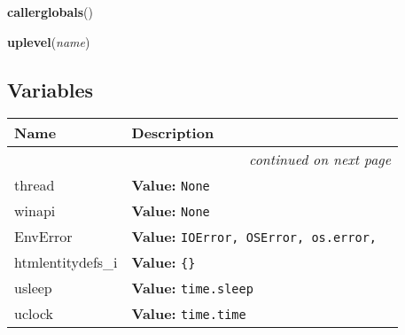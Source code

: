 \hspace{.8\funcindent}\begin{boxedminipage}{\funcwidth}

    \raggedright \textbf{callerglobals}()

\setlength{\parskip}{2ex}
\setlength{\parskip}{1ex}
    \end{boxedminipage}

    \label{nMOLDYN:GUI:HTMLReader:mfxutil:uplevel}

    \vspace{0.5ex}

\hspace{.8\funcindent}\begin{boxedminipage}{\funcwidth}

    \raggedright \textbf{uplevel}(\textit{name})

\setlength{\parskip}{2ex}
\setlength{\parskip}{1ex}
    \end{boxedminipage}



  \subsection{Variables}

    \vspace{-1cm}
\hspace{\varindent}\begin{longtable}{|p{\varnamewidth}|p{\vardescrwidth}|l}
\cline{1-2}
\cline{1-2} \centering \textbf{Name} & \centering \textbf{Description}& \\
\cline{1-2}
\endhead\cline{1-2}\multicolumn{3}{r}{\small\textit{continued on next page}}\\\endfoot\cline{1-2}
\endlastfoot\raggedright t\-h\-r\-e\-a\-d\- & \raggedright \textbf{Value:} 
{\tt None}&\\
\cline{1-2}
\raggedright w\-i\-n\-3\-2\-a\-p\-i\- & \raggedright \textbf{Value:} 
{\tt None}&\\
\cline{1-2}
\raggedright E\-n\-v\-E\-r\-r\-o\-r\- & \raggedright \textbf{Value:} 
{\tt IOError, OSError, os.error,}&\\
\cline{1-2}
\raggedright h\-t\-m\-l\-e\-n\-t\-i\-t\-y\-d\-e\-f\-s\-\_\-i\- & \raggedright \textbf{Value:} 
{\tt \{\}}&\\
\cline{1-2}
\raggedright u\-s\-l\-e\-e\-p\- & \raggedright \textbf{Value:} 
{\tt time.sleep}&\\
\cline{1-2}
\raggedright u\-c\-l\-o\-c\-k\- & \raggedright \textbf{Value:} 
{\tt time.time}&\\
\cline{1-2}
\end{longtable}


